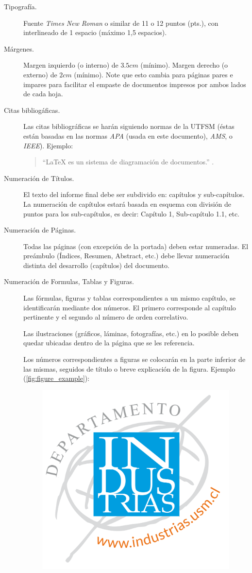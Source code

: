 \begin{description}
\item[Tipografía.] Fuente \emph{Times New Roman} o similar de 11 o 12 puntos (pts.), con interlineado de 1 espacio (máximo 1,5 espacios).
\item[Márgenes.] Margen izquierdo (o interno) de $3.5cm$ (mínimo). Margen derecho (o externo) de $2cm$ (mínimo). Note que esto cambia para páginas pares e impares para facilitar el empaste de documentos impresos por ambos lados de cada hoja.
\item[Citas bibliogáficas.] Las citas bibliográficas se harán siguiendo normas de la UTFSM (éstas están basadas en las normas \emph{APA} (usada en este documento), \emph{AMS}, o \emph{IEEE}). Ejemplo:

\begin{quote}
    ``\LaTeX{} es un sistema de diagramación de documentos.'' \citep{Lamport94}.
\end{quote}
\item[Numeración de Títulos.] El texto del informe final debe ser subdivido en: capítulos y sub-capítulos. La numeración de capítulos estará basada en esquema con división de puntos para los sub-capítulos, es decir: Capítulo 1, Sub-capítulo 1.1, etc.
\item[Numeración de Páginas.] Todas las páginas (con excepción de la portada) deben estar numeradas. El preámbulo (Índices, Resumen, Abstract, etc.) debe llevar numeración distinta del desarrollo (capítulos) del documento.
\item[Numeración de Formulas, Tablas y Figuras.] Las fórmulas, figuras y tablas correspondientes a un mismo capítulo, se identificarán mediante dos números. El primero corresponde al capítulo pertinente y el segundo al número de orden correlativo.

Las ilustraciones (gráficos, láminas, fotografías, etc.) en lo posible deben quedar ubicadas dentro de la página que se les referencia.

Los números correspondientes a figuras se colocarán en la parte inferior de las mismas, seguidos de título o breve explicación de la figura. Ejemplo (\autoref{fig:figure_example}):
	\begin{figure}[ht!]
	\centering
	\includegraphics[width=.4\textwidth]{figures/logoind.png}
	

\end{figure}
\end{description}
